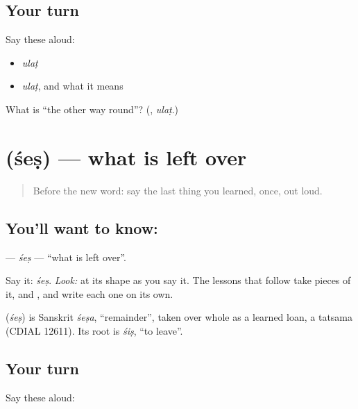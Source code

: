 \subsection*{Your turn}
Say these aloud:

\begin{itemize}
\raggedright
  \item \emph{ulaṭ}
  \item \emph{ulaṭ}, and what it means
\end{itemize}

\begin{tcolorbox}[breakable,colback=teal!4,colframe=teal!35!black,title={Before you move on}]
What is \textquotedblleft{}the other way round\textquotedblright{}? (\textbf{}, \emph{ulaṭ}.)
\end{tcolorbox}
\section[\texorpdfstring{\mr{शेष} (śeṣ)}{शेष (śeṣ)}]{ (śeṣ) — what is left over}

\label{lesson:MR-C08-shesh}



\begin{quote}
Before the new word: say the last thing you learned, once, out loud.
\end{quote}

\subsection*{You'll want to know: }
\textbf{} — \emph{śeṣ} — \textquotedblleft{}what is left over\textquotedblright{}.

Say it: \emph{śeṣ}. \emph{Look:} at its shape as you say it. The lessons that follow take pieces of it, \textbf{} and \textbf{}, and write each one on its own.

\begin{cousinweb}
\textbf{} (\emph{śeṣ}) is Sanskrit \emph{śeṣa}, \textquotedblleft{}remainder\textquotedblright{}, taken over whole as a learned loan, a tatsama (CDIAL 12611). Its root is \emph{śiṣ}, \textquotedblleft{}to leave\textquotedblright{}.
\end{cousinweb}

\subsection*{Your turn}
Say these aloud:

